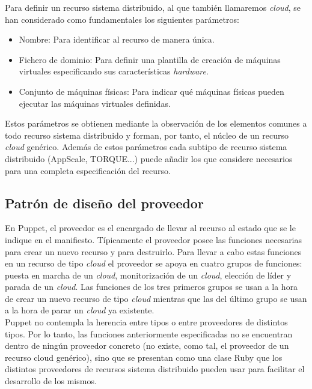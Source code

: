 Para definir un recurso sistema distribuido, al que también llamaremos \emph{cloud}, se han considerado como fundamentales los siguientes parámetros:

\begin{itemize}
\item Nombre: Para identificar al recurso de manera única.
\item Fichero de dominio: Para definir una plantilla de creación de máquinas virtuales especificando sus características \emph{hardware}.
\item Conjunto de máquinas físicas: Para indicar qué máquinas físicas pueden ejecutar las máquinas virtuales definidas.
\end{itemize}

Estos parámetros se obtienen mediante la observación de los elementos comunes a todo recurso sistema distribuido y forman, por tanto, el núcleo de un recurso \emph{cloud} genérico. Además de estos parámetros cada subtipo de recurso sistema distribuido (AppScale, TORQUE...) puede añadir los que considere necesarios para una completa especificación del recurso.


\subsection{Patrón de diseño del proveedor}

En Puppet, el proveedor es el encargado de llevar al recurso al estado que se le indique en el manifiesto. Típicamente el proveedor posee las funciones necesarias para crear un nuevo recurso y para destruirlo. Para llevar a cabo estas funciones en un recurso de tipo \emph{cloud} el proveedor se apoya en cuatro grupos de funciones: puesta en marcha de un \emph{cloud}, monitorización de un \emph{cloud}, elección de líder y parada de un \emph{cloud}. Las funciones de los tres primeros grupos se usan a la hora de crear un nuevo recurso de tipo \emph{cloud} mientras que las del último grupo se usan a la hora de parar un \emph{cloud} ya existente. \\

Puppet no contempla la herencia entre tipos o entre proveedores de distintos tipos. Por lo tanto, las funciones anteriormente especificadas no se encuentran dentro de ningún proveedor concreto (no existe, como tal, el proveedor de un recurso cloud genérico), sino que se presentan como una clase Ruby que los distintos proveedores de recursos sistema distribuido pueden usar para facilitar el desarrollo de los mismos. \\

